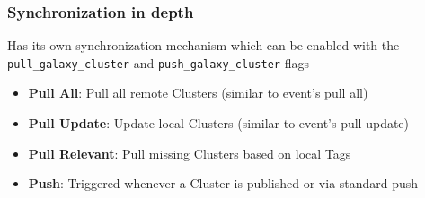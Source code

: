 \begin{frame}
    \frametitle{Synchronization in depth}
    Has its own synchronization mechanism which can be enabled with the \texttt{pull\_galaxy\_cluster} and \texttt{push\_galaxy\_cluster} flags
    \vspace{0.5em}
    \begin{itemize}
        \item \textbf{Pull All}: Pull all remote Clusters (similar to event's pull all)
        \item \textbf{Pull Update}: Update local Clusters (similar to event's pull update)
        \item \textbf{Pull Relevant}: Pull missing Clusters based on local Tags
        \item \textbf{Push}: Triggered whenever a Cluster is published or via standard push
    \end{itemize}
\end{frame}
